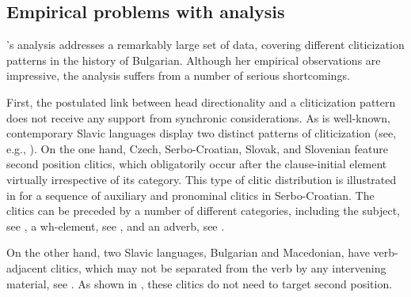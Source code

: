 \documentclass[output=paper,modfonts,newtxmath,hidelinks]{langscibook}
\begin{document}
\subsection{Empirical problems with  analysis}\label{11:s2.2}

\citeauthor{pancheva2005}’s analysis addresses a remarkably large set of data, covering different cliticization patterns in the history of Bulgarian. Although her empirical observations are impressive, the analysis suffers from a number of serious shortcomings. 

First, the postulated link between head directionality and a cliticization pattern does not receive any support from synchronic considerations. As is well-known, contemporary Slavic languages display two distinct patterns of cliticization (see, e.g., \citealt{Franks-King2000}). On the one hand, Czech, Serbo-Croatian, Slovak, and Slovenian feature second position clitics, which obligatorily occur after the clause-initial element virtually irrespective of its category. This type of clitic distribution is illustrated in  for a sequence of auxiliary and pronominal clitics in Serbo-Croatian. The clitics can be preceded by a number of different categories, including the subject, see , a wh-element, see , and an adverb, see . 

\ea \label{11:ex6}
	 \label{11:ex6a}
    \label{11:ex6b}
    \label{11:ex6c}
	\z
\z
On the other hand, two Slavic languages, Bulgarian and Macedonian, have verb-adjacent clitics, which may not be separated from the verb by any intervening material, see . As shown in , these clitics do not need to target second position. 
\end{document}
